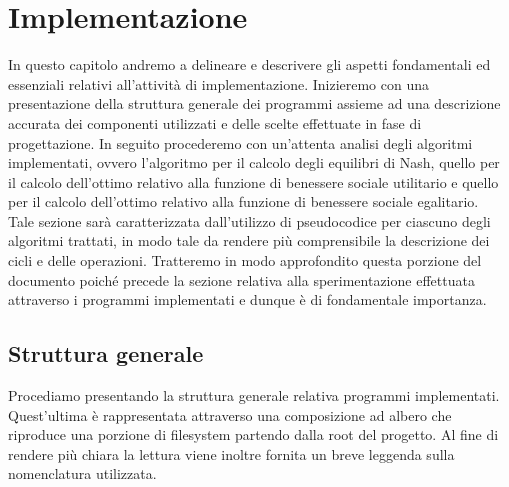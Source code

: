 \chapter{Implementazione}
\justify
In questo capitolo andremo a delineare e descrivere gli aspetti fondamentali ed essenziali relativi all'attività di implementazione. Inizieremo con una presentazione della struttura generale dei programmi assieme ad una descrizione accurata dei componenti utilizzati e delle scelte effettuate in fase di progettazione. In seguito procederemo con un'attenta analisi degli algoritmi implementati, ovvero l'algoritmo per il calcolo degli equilibri di Nash, quello per il calcolo dell'ottimo relativo alla funzione di benessere sociale utilitario e quello per il calcolo dell'ottimo relativo alla funzione di benessere sociale egalitario.\\
Tale sezione sarà caratterizzata dall'utilizzo di pseudocodice per ciascuno degli algoritmi trattati, in modo tale da rendere più comprensibile la descrizione dei cicli e delle operazioni. Tratteremo in modo approfondito questa porzione del documento poiché precede la sezione relativa alla sperimentazione effettuata attraverso i programmi implementati e dunque è di fondamentale importanza.\\

\section{Struttura generale}
\justify
Procediamo presentando la struttura generale relativa programmi implementati. Quest'ultima è rappresentata attraverso una composizione ad albero che riproduce una porzione di filesystem partendo dalla root del progetto. Al fine di rendere più chiara la lettura viene inoltre fornita un breve leggenda sulla nomenclatura utilizzata.

